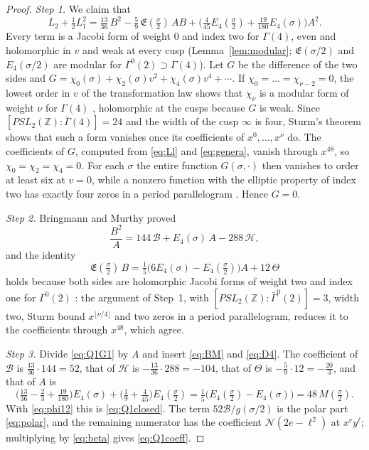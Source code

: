 \documentclass[11pt]{amsart}
\theoremstyle{definition}
\newcommand{\ZZ}{\mathbb{Z}}
\newcommand{\cB}{\mathcal B}
\newcommand{\cH}{\mathcal H}
\newcommand{\fE}{\mathfrak E}
\begin{document}
\begin{proof}
\emph{Step 1.} We claim that
\begin{equation}\label{eq:Q1G1}
L_2+\tfrac12L_1^2=\tfrac{13}{36}\,B^2-\tfrac59\,\fE(\tfrac\sigma2)\,AB+\Big(\tfrac4{45}E_4(\tfrac\sigma2)+\tfrac{19}{180}E_4(\sigma)\Big)A^2 .
\end{equation}
Every term is a Jacobi form of weight $0$ and index two for $\Gamma(4)$, even and holomorphic in $v$ and weak at every cusp (Lemma~\ref{lem:modular}; $\fE(\sigma/2)$ and $E_4(\sigma/2)$ are modular for $\Gamma^0(2)\supset\Gamma(4)$). Let $G$ be the difference of the two sides and $G=\chi_0(\sigma)+\chi_2(\sigma)v^2+\chi_4(\sigma)v^4+\cdots$. If $\chi_0=\dots=\chi_{\nu-2}=0$, the lowest order in $v$ of the transformation law shows that $\chi_\nu$ is a modular form of weight $\nu$ for $\Gamma(4)$ \cite[\S3]{EZ85}, holomorphic at the cusps because $G$ is weak. Since $[PSL_2(\ZZ):\bar\Gamma(4)]=24$ and the width of the cusp $\infty$ is four, Sturm's theorem \cite{Stu87} shows that such a form vanishes once its coefficients of $x^0,\dots,x^{\nu}$ do. The coefficients of $G$, computed from \eqref{eq:Ll} and \eqref{eq:genera}, vanish through $x^{48}$, so $\chi_0=\chi_2=\chi_4=0$. For each $\sigma$ the entire function $G(\sigma,\cdot)$ then vanishes to order at least six at $v=0$, while a nonzero function with the elliptic property of index two has exactly four zeros in a period parallelogram \cite[Theorem~1.2]{EZ85}. Hence $G=0$.

\emph{Step 2.} Bringmann and Murthy \cite[Section~3]{BM13} proved
\begin{equation}\label{eq:BM}
\frac{B^2}{A}=144\,\cB+E_4(\sigma)\,A-288\,\cH ,
\end{equation}
and the identity
\begin{equation}\label{eq:D4}
\fE(\tfrac\sigma2)\,B=\tfrac15\big(6E_4(\sigma)-E_4(\tfrac\sigma2)\big)A+12\,\Theta
\end{equation}
holds because both sides are holomorphic Jacobi forms of weight two and index one for $\Gamma^0(2)$ \cite[\S7]{EZ85}: the argument of Step~1, with $[PSL_2(\ZZ):\bar\Gamma^0(2)]=3$, width two, Sturm bound $x^{\lfloor\nu/4\rfloor}$ and two zeros in a period parallelogram, reduces it to the coefficients through $x^{48}$, which agree.

\emph{Step 3.} Divide \eqref{eq:Q1G1} by $A$ and insert \eqref{eq:BM} and \eqref{eq:D4}. The coefficient of $\cB$ is $\frac{13}{36}\cdot144=52$, that of $\cH$ is $-\frac{13}{36}\cdot288=-104$, that of $\Theta$ is $-\frac59\cdot12=-\frac{20}3$, and that of $A$ is
\[
\Big(\tfrac{13}{36}-\tfrac23+\tfrac{19}{180}\Big)E_4(\sigma)+\Big(\tfrac19+\tfrac4{45}\Big)E_4(\tfrac\sigma2)=\tfrac15\big(E_4(\tfrac\sigma2)-E_4(\sigma)\big)=48\,M(\tfrac\sigma2).
\]
With \eqref{eq:phi12} this is \eqref{eq:Q1closed}. The term $52\cB/g(\sigma/2)$ is the polar part \eqref{eq:polar}, and the remaining numerator has the coefficient $\mathcal N(2e-\ell^2)$ at $x^ey^\ell$; multiplying by \eqref{eq:beta} gives \eqref{eq:Q1coeff}.
\end{proof}
\end{document}
